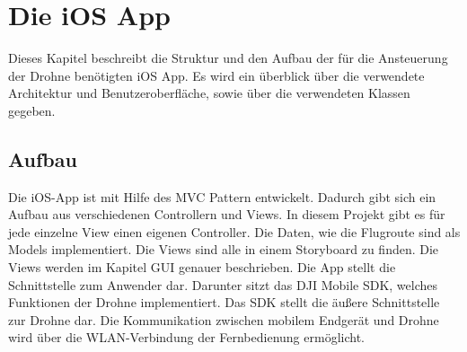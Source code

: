 
\chapter{Die iOS App}\label{cha:iOS App}

Dieses Kapitel beschreibt die Struktur und den Aufbau der für die Ansteuerung der Drohne benötigten iOS App. Es wird ein überblick über die verwendete Architektur und Benutzeroberfläche, sowie über die verwendeten Klassen gegeben.

\section{Aufbau}
Die iOS-App ist mit Hilfe des \acs{MVC} Pattern entwickelt. Dadurch gibt sich ein Aufbau aus verschiedenen Controllern und Views. In diesem Projekt gibt es für jede einzelne View einen eigenen Controller. Die Daten, wie die Flugroute sind als Models implementiert. 
\newline
Die Views sind alle in einem Storyboard zu finden. Die Views werden im Kapitel \acs{GUI} genauer beschrieben. 
\newline
Die App stellt die Schnittstelle zum Anwender dar. Darunter sitzt das DJI Mobile SDK, welches Funktionen der Drohne implementiert. Das \acs{SDK} stellt die äußere Schnittstelle zur Drohne dar.
\newline Die Kommunikation zwischen mobilem Endgerät und Drohne wird über die WLAN-Verbindung der Fernbedienung ermöglicht. 

